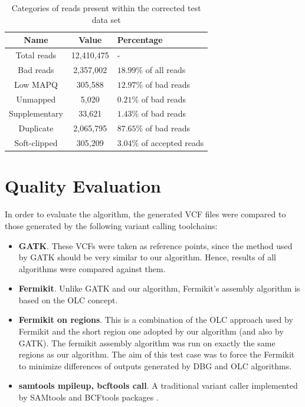 \begin{table}[h]
\begin{center}
\caption{Categories of reads present within the corrected test data set}
\label{tab:corrected-set-categories}
\begin{tabular}{| c | c | p{5cm} |}
\hline
Name & Value & Percentage \\
\hline
Total reads & 12,410,475 & - \\
\hline
Bad reads & 2,357,002  & $18.99$\% of all reads \\
\hline
Low MAPQ & 305,588 & $12.97$\% of bad reads \\
\hline
Unmapped & 5,020 & $0.21$\% of bad reads \\
\hline
Supplementary & 33,621 & $1.43$\% of bad reads \\
\hline
Duplicate & 2,065,795 & $87.65$\% of bad reads \\
\hline
Soft-clipped & 305,209 & $3.04$\% of accepted reads \\
\hline
\end{tabular}
\end{center}
\end{table}

\section{Quality Evaluation}
\label{sec:quality-evaulation}

In order to evaluate the algorithm, the generated VCF files were compared to those generated by the following variant calling toolchains:
\begin{itemize}
\item \textbf{GATK}. These VCFs were taken as reference points, since the method used by GATK should be very similar to our algorithm. Hence, results of all algorithms were compared against them.
\item \textbf{Fermikit}. Unlike GATK and our algorithm, Fermikit's assembly algorithm is based on the OLC concept.
\item \textbf{Fermikit on regions}. This is a combination of the OLC approach used by Fermikit and the short region one adopted by our algorithm (and also by GATK). The fermikit assembly algorithm was run on exactly the same regions as our algorithm. The aim of this test case was to force the Fermikit to minimize differences of outputs generated by DBG and OLC algorithms.
\item \textbf{samtools mpileup, bcftools call}. A traditional variant caller implemented by SAMtools and BCFtools packages \cite{samtools}.
\end{itemize}

